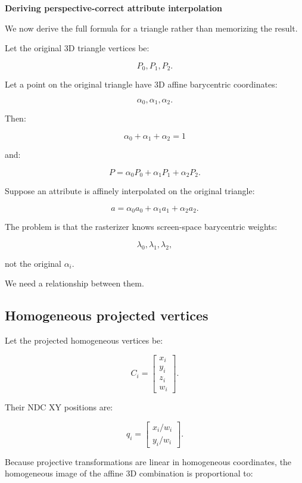 \textbf{Deriving perspective-correct attribute interpolation}

We now derive the full formula for a triangle rather than memorizing the result.

Let the original 3D triangle vertices be:

\[
 P_0,P_1,P_2.
\]

Let a point on the original triangle have 3D affine barycentric coordinates:

\[
 \alpha_0,\alpha_1,\alpha_2.
\]

Then:

\[
 \boxed{ \alpha_0+\alpha_1+\alpha_2=1 }
\]

and:

\[
 \boxed{ P=\alpha_0P_0+\alpha_1P_1+\alpha_2P_2 }.
\]

Suppose an attribute is affinely interpolated on the original triangle:

\[
 \boxed{ a=\alpha_0a_0+\alpha_1a_1+\alpha_2a_2 }.
\]

The problem is that the rasterizer knows screen-space barycentric weights:

\[
 \lambda_0,\lambda_1,\lambda_2,
\]

not the original \(\alpha_i\).

We need a relationship between them.

\subsection{Homogeneous projected vertices}\label{02-foundations-ii-ch034-homogeneous-projected-vertices}

\hypertarget{02-foundations-ii-ch034-homogeneous-projected-vertices}{}

Let the projected homogeneous vertices be:

\[
 C_i= \begin{bmatrix} x_i\\y_i\\z_i\\w_i \end{bmatrix}.
\]

Their NDC XY positions are:

\[
 q_i= \begin{bmatrix} x_i/w_i\\ y_i/w_i \end{bmatrix}.
\]

Because projective transformations are linear in homogeneous coordinates, the homogeneous image of the affine 3D combination is proportional to:

